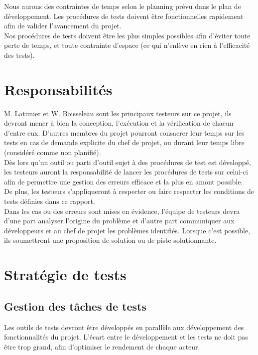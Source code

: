 \documentclass[a4paper,11pt,french]{article}
\begin{document}
Nous aurons des contraintes de temps selon le planning prévu dans le plan de développement. Les procédures de tests doivent être fonctionnelles rapidement afin de valider l'avancement du projet.\\

Nos procédures de tests doivent être les plus simples possibles afin d'éviter toute perte de temps, et toute contrainte d'espace (ce qui n'enlève en rien à l'efficacité des tests).


\section{Responsabilités}
M. Latimier et W. Boisseleau sont les principaux testeurs sur ce projet, ils devront mener à bien la conception, l'exécution et la vérification de chacun d'entre eux. D'autres membres du projet pourront consacrer leur temps sur les tests en cas de demande explicite du chef de projet, ou durant leur temps libre (considéré comme non planifié).\\


Dès lors qu'un outil ou parti d'outil sujet à des procédures de test est développé, les testeurs auront la responsabilité de lancer les procédures de tests sur celui-ci afin de permettre une gestion des erreurs efficace et la plus en amont possible.  \\

De plus, les testeurs s'appliqueront à respecter ou faire respecter les conditions de tests définies dans ce rapport.\\

Dans les cas ou des erreurs sont mises en évidence, l'équipe de testeurs devra d'une part analyser l'origine du problème et d'autre part communiquer aux développeurs et au chef de projet les problèmes identifiés. Lorsque c'est possible, ils soumettront une proposition de solution ou de piste solutionnante.


\newpage
\section{Stratégie de tests}

\subsection{Gestion des tâches de tests}

Les outils de tests devront être développés en parallèle aux développement des fonctionnalités du projet. L'écart entre le développement et les tests ne doit pas être trop grand, afin d'optimiser le rendement de chaque acteur.\\
\end{document}
